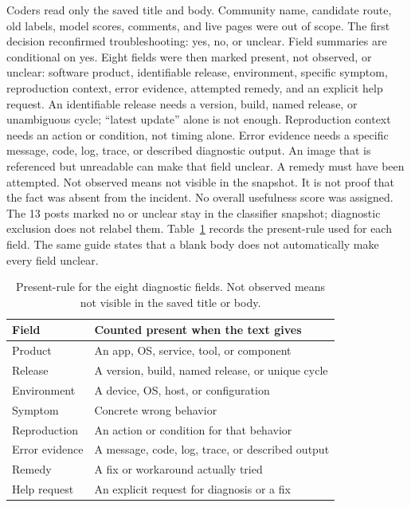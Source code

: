 \documentclass[conference,letterpaper]{IEEEtran}
\begin{document}
Coders read only the saved title and body. Community name, candidate route, old labels, model scores, comments, and live pages were out of scope. The first decision reconfirmed troubleshooting: yes, no, or unclear. Field summaries are conditional on yes. Eight fields were then marked present, not observed, or unclear: software product, identifiable release, environment, specific symptom, reproduction context, error evidence, attempted remedy, and an explicit help request. An identifiable release needs a version, build, named release, or unambiguous cycle; ``latest update'' alone is not enough. Reproduction context needs an action or condition, not timing alone. Error evidence needs a specific message, code, log, trace, or described diagnostic output. An image that is referenced but unreadable can make that field unclear. A remedy must have been attempted. Not observed means not visible in the snapshot. It is not proof that the fact was absent from the incident. No overall usefulness score was assigned. The 13 posts marked no or unclear stay in the classifier snapshot; diagnostic exclusion does not relabel them. Table~\ref{tab:code} records the present-rule used for each field. The same guide states that a blank body does not automatically make every field unclear.

\begin{table}[t]
\caption{Present-rule for the eight diagnostic fields. Not observed means not visible in the saved title or body.}
\label{tab:code}
\centering
\footnotesize
\setlength{\tabcolsep}{3pt}
\begin{tabular}{lp{4.6cm}}
\toprule
Field & Counted present when the text gives \\
\midrule
Product & An app, OS, service, tool, or component \\
Release & A version, build, named release, or unique cycle \\
Environment & A device, OS, host, or configuration \\
Symptom & Concrete wrong behavior \\
Reproduction & An action or condition for that behavior \\
Error evidence & A message, code, log, trace, or described output \\
Remedy & A fix or workaround actually tried \\
Help request & An explicit request for diagnosis or a fix \\
\bottomrule
\end{tabular}
\end{table}
\end{document}
